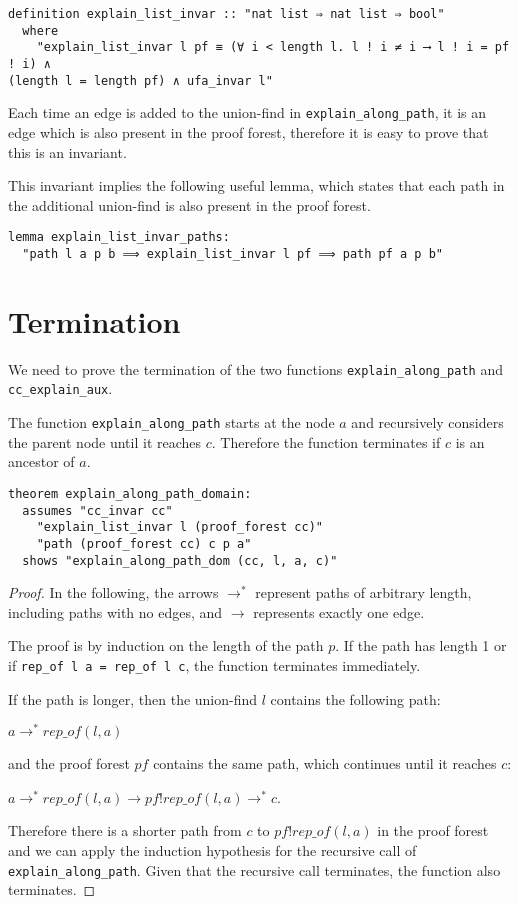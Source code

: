 \begin{lstlisting}
definition explain_list_invar :: "nat list ⇒ nat list ⇒ bool"
  where
    "explain_list_invar l pf ≡ (∀ i < length l. l ! i ≠ i ⟶ l ! i = pf ! i) ∧
(length l = length pf) ∧ ufa_invar l"
\end{lstlisting}

Each time an edge is added to the union-find in \lstinline{explain_along_path}, it is an edge which is also present in the proof forest, therefore it is easy to prove that this is an invariant.

This invariant implies the following useful lemma, which states that each path in the additional union-find is also present in the proof forest.

\begin{lstlisting}
lemma explain_list_invar_paths:
  "path l a p b ⟹ explain_list_invar l pf ⟹ path pf a p b"
\end{lstlisting}

\section{Termination}

We need to prove the termination of the two functions \lstinline{explain_along_path} and \lstinline{cc_explain_aux}.

The function \lstinline{explain_along_path} starts at the node $a$ and recursively considers the parent node until it reaches $c$. Therefore the function terminates if $c$ is an ancestor of $a$.

\begin{lstlisting}
theorem explain_along_path_domain:
  assumes "cc_invar cc"
    "explain_list_invar l (proof_forest cc)"
    "path (proof_forest cc) c p a"
  shows "explain_along_path_dom (cc, l, a, c)"
\end{lstlisting}

\begin{proof}
In the following, the arrows $\rightarrow^*$ represent paths of arbitrary length, including paths with no edges, and $\rightarrow$ represents exactly one edge.

The proof is by induction on the length of the path $p$.
If the path has length 1 or if \lstinline{rep_of l a = rep_of l c}, the function terminates immediately.

If the path is longer, then the union-find $l$ contains the following path:

$a \rightarrow^* rep\_of(l,a)$

and the proof forest $pf$ contains the same path, which continues until it reaches $c$:

$a \rightarrow^* rep\_of(l,a) \rightarrow pf ! rep\_of(l,a) \rightarrow^* c$.

Therefore there is a shorter path from $c$ to $pf ! rep\_of(l,a)$ in the proof forest and we can apply the induction hypothesis for the recursive call of \lstinline{explain_along_path}. Given that the recursive call terminates, the function also terminates.
\end{proof}

